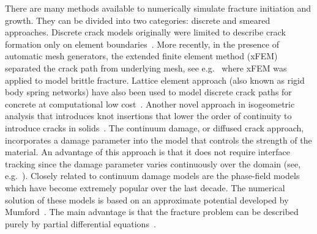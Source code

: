 \documentclass[11pt]{acmeArticle}
\numberwithin{equation}{section}
\begin{document}
There are many methods available to numerically simulate fracture initiation and growth. 
They can be divided into two categories: discrete and smeared approaches. 
Discrete crack models originally were limited to describe crack formation only on element boundaries~\citep{Scordelis1967}. 
More recently, in the presence of automatic mesh generators, the extended finite element method (xFEM) separated the crack path from underlying mesh, see e.g.~\citep{Belytschko1999} where xFEM was applied to model brittle fracture. 
Lattice element approach (also known as rigid body spring networks) have also been used to model discrete crack paths for concrete at computational low cost~\citep{bolanderSaito1998, grassl2010}.  
Another novel approach in isogeometric analysis that introduces knot insertions that lower the order of continuity to introduce cracks in solids~\citep{Hosseini2014}. 
The continuum damage, or diffused crack approach, incorporates a damage parameter into the model that controls the strength of the material. An advantage of this approach is that it does not require interface tracking since the damage parameter varies continuously over the domain (see, e.g.~\citep{deBorst2004}). 
Closely related to continuum damage models are the phase-field models which have become extremely popular over the last decade. 
The numerical solution of these models is based on an approximate potential developed by Mumford~\citep{Mumford1989}. 
The main advantage is that the fracture problem can be described purely by partial differential equations~\citep{Miehe2010a,Borst2014}. \\
\end{document}
